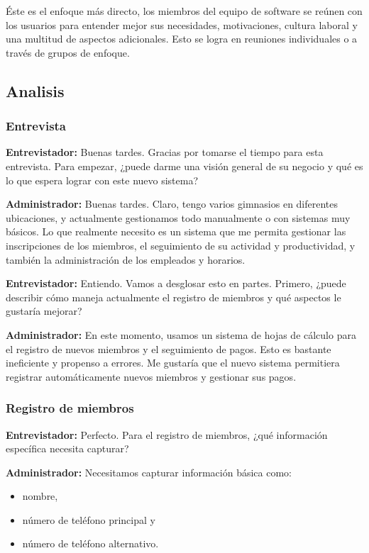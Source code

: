 \documentclass[spanish,12pt]{article}
\providecommand{\tightlist}{\setlength{\itemsep}{0pt}\setlength{\parskip}{0pt}}
\begin{document}
Éste es el enfoque más directo, los miembros del equipo de software se
reúnen con los usuarios para entender mejor sus necesidades,
motivaciones, cultura laboral y una multitud de aspectos adicionales.
Esto se logra en reuniones individuales o a través de grupos de enfoque.

\subsection{Analisis}\label{analisis}

\subsubsection{Entrevista}\label{entrevista}

\textbf{Entrevistador:} Buenas tardes. Gracias por tomarse el tiempo
para esta entrevista. Para empezar, ¿puede darme una visión general de
su negocio y qué es lo que espera lograr con este nuevo sistema?

\textbf{Administrador:} Buenas tardes. Claro, tengo varios gimnasios en
diferentes ubicaciones, y actualmente gestionamos todo manualmente o con
sistemas muy básicos. Lo que realmente necesito es un sistema que me
permita gestionar las inscripciones de los miembros, el seguimiento de
su actividad y productividad, y también la administración de los
empleados y horarios.

\textbf{Entrevistador:} Entiendo. Vamos a desglosar esto en partes.
Primero, ¿puede describir cómo maneja actualmente el registro de
miembros y qué aspectos le gustaría mejorar?

\textbf{Administrador:} En este momento, usamos un sistema de hojas de
cálculo para el registro de nuevos miembros y el seguimiento de pagos.
Esto es bastante ineficiente y propenso a errores. Me gustaría que el
nuevo sistema permitiera registrar automáticamente nuevos miembros y
gestionar sus pagos.

\subsubsection{Registro de miembros}\label{registro-de-miembros}

\textbf{Entrevistador:} Perfecto. Para el registro de miembros, ¿qué
información específica necesita capturar?

\textbf{Administrador:} Necesitamos capturar información básica como:

\begin{itemize}
\tightlist
\item
  nombre,
\item
  número de teléfono principal y
\item
  número de teléfono alternativo.
\end{itemize}
\end{document}
